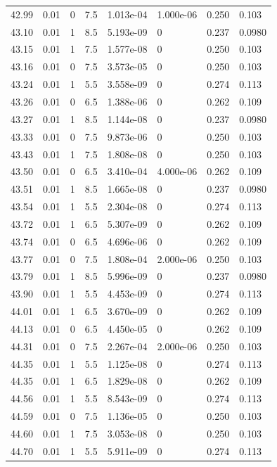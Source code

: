 \documentclass[preview]{standalone}
\begin{document}
{{{{{{{{{{{{{{\begin{tabular}{L{1.2cm}C{1.2cm} C{0.3cm}C{0.5cm} C{1.4cm}C{1.4cm} C{1.4cm}C{1.4cm}}
  42.99  &  0.01  & 0     & 7.5 &  1.013e-04  & 1.000e-06  & 0.250 &  0.103   \\ 
  43.10  &  0.01  & 1     & 8.5 &  5.193e-09  & 0  & 0.237 &  0.0980   \\ 
  43.15  &  0.01  & 1     & 7.5 &  1.577e-08  & 0  & 0.250 &  0.103   \\ 
  43.16  &  0.01  & 0     & 7.5 &  3.573e-05  & 0  & 0.250 &  0.103   \\ 
  43.24  &  0.01  & 1     & 5.5 &  3.558e-09  & 0  & 0.274 &  0.113   \\ 
  43.26  &  0.01  & 0     & 6.5 &  1.388e-06  & 0  & 0.262 &  0.109   \\ 
  43.27  &  0.01  & 1     & 8.5 &  1.144e-08  & 0  & 0.237 &  0.0980   \\ 
  43.33  &  0.01  & 0     & 7.5 &  9.873e-06  & 0  & 0.250 &  0.103   \\ 
  43.43  &  0.01  & 1     & 7.5 &  1.808e-08  & 0  & 0.250 &  0.103   \\ 
  43.50  &  0.01  & 0     & 6.5 &  3.410e-04  & 4.000e-06  & 0.262 &  0.109   \\ 
  43.51  &  0.01  & 1     & 8.5 &  1.665e-08  & 0  & 0.237 &  0.0980   \\ 
  43.54  &  0.01  & 1     & 5.5 &  2.304e-08  & 0  & 0.274 &  0.113   \\ 
  43.72  &  0.01  & 1     & 6.5 &  5.307e-09  & 0  & 0.262 &  0.109   \\ 
  43.74  &  0.01  & 0     & 6.5 &  4.696e-06  & 0  & 0.262 &  0.109   \\ 
  43.77  &  0.01  & 0     & 7.5 &  1.808e-04  & 2.000e-06  & 0.250 &  0.103   \\ 
  43.79  &  0.01  & 1     & 8.5 &  5.996e-09  & 0  & 0.237 &  0.0980   \\ 
  43.90  &  0.01  & 1     & 5.5 &  4.453e-09  & 0  & 0.274 &  0.113   \\ 
  44.01  &  0.01  & 1     & 6.5 &  3.670e-09  & 0  & 0.262 &  0.109   \\ 
  44.13  &  0.01  & 0     & 6.5 &  4.450e-05  & 0  & 0.262 &  0.109   \\ 
  44.31  &  0.01  & 0     & 7.5 &  2.267e-04  & 2.000e-06  & 0.250 &  0.103   \\ 
  44.35  &  0.01  & 1     & 5.5 &  1.125e-08  & 0  & 0.274 &  0.113   \\ 
  44.35  &  0.01  & 1     & 6.5 &  1.829e-08  & 0  & 0.262 &  0.109   \\ 
  44.56  &  0.01  & 1     & 5.5 &  8.543e-09  & 0  & 0.274 &  0.113   \\ 
  44.59  &  0.01  & 0     & 7.5 &  1.136e-05  & 0  & 0.250 &  0.103   \\ 
  44.60  &  0.01  & 1     & 7.5 &  3.053e-08  & 0  & 0.250 &  0.103   \\ 
  44.70  &  0.01  & 1     & 5.5 &  5.911e-09  & 0  & 0.274 &  0.113   \\ 
\hline 
\end{tabular} 

}}}}}}}}}}}}}}
\end{document}
